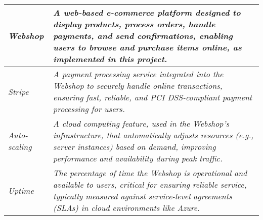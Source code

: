 \begin{longtable}[]{@{}
  >{\raggedright\arraybackslash}p{}
  >{\raggedright\arraybackslash}p{}@{}}
\emph{Webshop} &
\emph{A web-based e-commerce platform designed to display products, process orders, handle payments, and send confirmations, enabling users to browse and purchase items online, as implemented in this project.} \\ \hline
\emph{Stripe} &
\emph{A payment processing service integrated into the Webshop to securely handle online transactions, ensuring fast, reliable, and PCI DSS-compliant payment processing for users.} \\ \hline
\emph{Auto-scaling} &
\emph{A cloud computing feature, used in the Webshop’s infrastructure, that automatically adjusts resources (e.g., server instances) based on demand, improving performance and availability during peak traffic.} \\ \hline
\emph{Uptime} &
\emph{The percentage of time the Webshop is operational and available to users, critical for ensuring reliable service, typically measured against service-level agreements (SLAs) in cloud environments like Azure.} \\
\bottomrule
\end{longtable}
